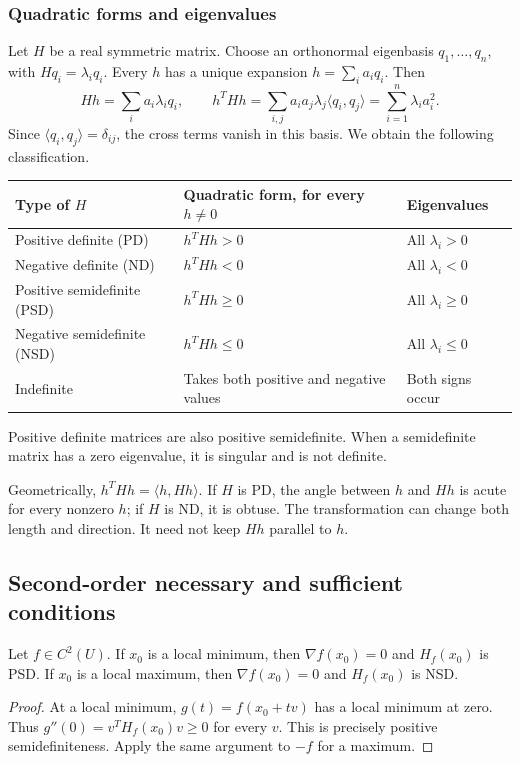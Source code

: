 \subsubsection*{Quadratic forms and eigenvalues}
Let $H$ be a real symmetric matrix. Choose an orthonormal eigenbasis $q_1,\ldots,q_n$, with $Hq_i=\lambda_iq_i$. Every $h$ has a unique expansion $h=\sum_i a_iq_i$. Then
\begin{equation}
 Hh=\sum_i a_i\lambda_iq_i,
 \qquad h^THh=\sum_{i,j}a_i a_j\lambda_j\langle q_i,q_j\rangle
             =\sum_{i=1}^n\lambda_i a_i^2.
 \label{eq:lec07-spectral}
\end{equation}
Since $\langle q_i,q_j\rangle=\delta_{ij}$, the cross terms vanish in this basis. We obtain the following classification.
\begin{center}
\small
\begin{tabular}{lll}
\toprule
Type of $H$ & Quadratic form, for every $h\ne0$ & Eigenvalues\\
\midrule
Positive definite (PD) & $h^THh>0$ & All $\lambda_i>0$\\
Negative definite (ND) & $h^THh<0$ & All $\lambda_i<0$\\
Positive semidefinite (PSD) & $h^THh\ge0$ & All $\lambda_i\ge0$\\
Negative semidefinite (NSD) & $h^THh\le0$ & All $\lambda_i\le0$\\
Indefinite & Takes both positive and negative values & Both signs occur\\
\bottomrule
\end{tabular}
\end{center}
Positive definite matrices are also positive semidefinite. When a semidefinite matrix has a zero eigenvalue, it is singular and is not definite.

Geometrically, $h^THh=\langle h,Hh\rangle$. If $H$ is PD, the angle between $h$ and $Hh$ is acute for every nonzero $h$; if $H$ is ND, it is obtuse. The transformation can change both length and direction. It need not keep $Hh$ parallel to $h$.

\subsection{Second-order necessary and sufficient conditions}
\begin{proposition}
Let $f\in C^2(U)$. If $x_0$ is a local minimum, then $\nabla f(x_0)=0$ and $H_f(x_0)$ is PSD. If $x_0$ is a local maximum, then $\nabla f(x_0)=0$ and $H_f(x_0)$ is NSD.
\end{proposition}
\begin{proof}
At a local minimum, $g(t)=f(x_0+tv)$ has a local minimum at zero. Thus $g''(0)=v^TH_f(x_0)v\ge0$ for every $v$. This is precisely positive semidefiniteness. Apply the same argument to $-f$ for a maximum.
\end{proof}

